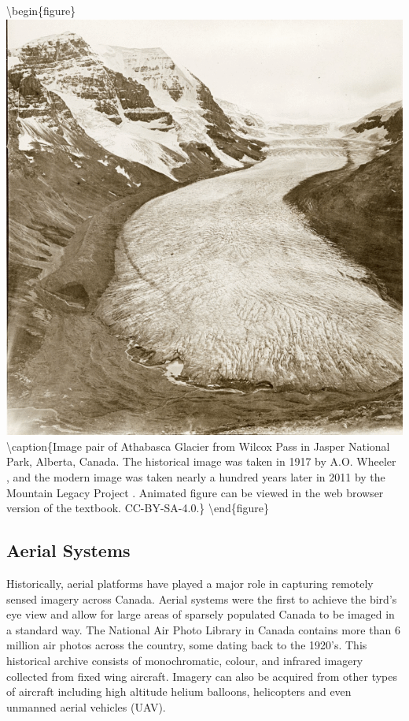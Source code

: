 \documentclass[
]{book}
\begin{document}
\textbackslash begin\{figure\}
\includegraphics[width=0.9\linewidth]{images/12-mountain-legacy-project} \textbackslash caption\{Image pair of Athabasca Glacier from Wilcox Pass in Jasper National Park, Alberta, Canada. The historical image was taken in 1917 by A.O. Wheeler \citep{library_and_archives_canada_athabasca_1917}, and the modern image was taken nearly a hundred years later in 2011 by the Mountain Legacy Project \citep{mountain_legacy_project_modern_2011}. Animated figure can be viewed in the web browser version of the textbook. CC-BY-SA-4.0.\}\label{fig:12-mountain-legacy-project}
\textbackslash end\{figure\}

\hypertarget{aerial-systems}{%
\subsection{Aerial Systems}\label{aerial-systems}}

Historically, aerial platforms have played a major role in capturing remotely sensed imagery across Canada. Aerial systems were the first to achieve the bird's eye view and allow for large areas of sparsely populated Canada to be imaged in a standard way. The National Air Photo Library in Canada contains more than 6 million air photos across the country, some dating back to the 1920's. This historical archive consists of monochromatic, colour, and infrared imagery collected from fixed wing aircraft. Imagery can also be acquired from other types of aircraft including high altitude helium balloons, helicopters and even unmanned aerial vehicles (UAV).
\end{document}
